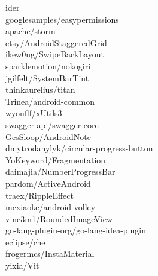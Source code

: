 \documentclass[twoside]{praca}
\begin{document}
\begin{multicols}{3}
ider\\googlesamples/easy\-permissions\\apache/storm\\etsy/AndroidStaggeredGrid\\ikew0ng/SwipeBackLayout\\sparklemotion/nokogiri\\jgilfelt/SystemBarTint\\thinkaurelius/titan\\Trinea/android-common\\wyouflf/xUtils3\\swagger-api/swagger-core\\GcsSloop/AndroidNote\\dmytrodanylyk/circular-progress-button\\YoKeyword/Fragmentation\\daimajia/NumberProgressBar\\pardom/ActiveAndroid\\traex/RippleEffect\\mcxiaoke/android-volley\\vinc3m1/RoundedImageView\\go-lang-plugin-org/go-lang-idea-plugin\\eclipse/che\\frogermcs/InstaMaterial\\yixia/Vit
\end{multicols}
\end{document}
